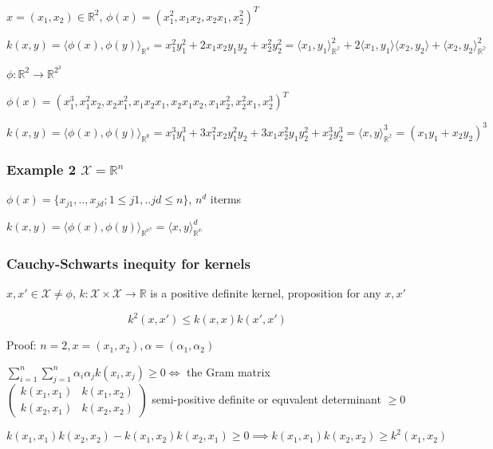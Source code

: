 \documentclass[10pt,portrait]{article}
\begin{document}
\(x=(x_1,x_2) \in \mathbb{R}^2\),
\(\phi(x)=(x_1^2,x_1x_2,x_2x_1,x_2^2)^T\)

\(k(x,y)=\langle\phi(x),\phi(y)\rangle_{\mathbb{R^4}}=x_1^2y_1^2+2x_1x_2y_1y_2+x_2^2y_2^2=\langle x_1,y_1\rangle^2_{\mathbb{R^2}}+2\langle x_1,y_1\rangle\langle x_2,y_2\rangle+\langle x_2,y_2\rangle^2_{\mathbb{R^2}}\)

\(\phi: \mathbb{R}^2\to\mathbb{R}^{2^3}\)

\(\phi(x)=(x_1^3, x_1^2x_2, x_2x_1^2, x_1x_2x_1, x_2x_1x_2, x_1x_2^2, x_2^2x_1, x_2^3)^T\)

\(k(x,y)=\langle\phi(x),\phi(y)\rangle_{\mathbb{R^8}}=x_1^3y_1^3+3x_1^2x_2y_1^2y_2+3x_1x_2^2y_1y_2^2+x_2^3y_2^3=\langle x,y\rangle^3_{\mathbb{R^2}}=(x_1y_1+x_2y_2)^3\)

\hypertarget{example-2-mathcalxmathbbrn}{%
\subsubsection{\texorpdfstring{Example 2
\(\mathcal{X}=\mathbb{R}^n\)}{Example 2 \textbackslash{}mathcal\{X\}=\textbackslash{}mathbb\{R\}\^{}n}}\label{example-2-mathcalxmathbbrn}}

\(\phi(x)=\{x_{j1},..,x_{jd};1\le j1,..jd\le n\}\), \(n^d\) iterms

\(k(x,y)=\langle\phi(x),\phi(y)\rangle_{\mathbb{R^{n^d}}}=\langle x,y\rangle^d_{\mathbb{R^n}}\)

\hypertarget{cauchy-schwarts-inequity-for-kernels}{%
\subsubsection{Cauchy-Schwarts inequity for
kernels}\label{cauchy-schwarts-inequity-for-kernels}}

\(x,x'\in\mathcal{X}\neq\phi\),
\(k: \mathcal{X}\times\mathcal{X} \to \mathbb{R}\) is a positive
definite kernel, proposition for any \(x,x'\)

\[k^2(x,x')\le k(x,x)k(x',x')\]

Proof: \(n=2, x=(x_1,x_2), \alpha=(\alpha_1, \alpha_2)\)

\(\sum_{i=1}^n\sum_{j=1}^n\alpha_i\alpha_jk(x_i,x_j)\ge0 \iff\) the Gram
matrix
\(\begin{pmatrix}k(x_1,x_1)&k(x_1,x_2)\\k(x_2,x_1)&k(x_2,x_2)\end{pmatrix}\)
semi-positive definite or equvalent determinant \(\ge0\)

\[k(x_1,x_1)k(x_2,x_2)- k(x_1,x_2)k(x_2,x_1)\ge0\implies k(x_1,x_1)k(x_2,x_2)\ge k^2(x_1,x_2)\]
\end{document}
